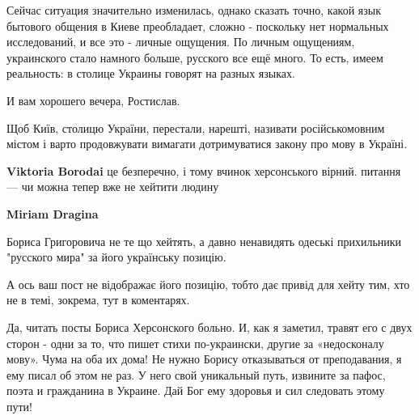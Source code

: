 \begin{itemize}
\begin{itemize}
Сейчас ситуация значительно изменилась, однако сказать точно, какой язык
бытового общения в Киеве преобладает, сложно - поскольку нет нормальных
исследований, и все это - личные ощущения. По личным ощущениям, украинского
стало намного больше, русского все ещё много. То есть, имеем реальность: в
столице Украины говорят на разных языках. 

И вам хорошего вечера, Ростислав.

\end{itemize}

 

Щоб Київ, столицю України, перестали, нарешті, називати російськомовним містом
і варто продовжувати вимагати дотримуватися закону про мову в Україні.

\begin{itemize}
 
\textbf{Viktoria Borodai} це безперечно, і тому вчинок херсонського вірний. питання — чи можна тепер вже не хейтити людину

 
\textbf{Miriam Dragina} 

Бориса Григоровича не те що хейтять, а давно ненавидять одеські прихильники
"русского мира" за його українську позицію.

А ось ваш пост не відображає його позицію, тобто дає привід для хейту тим, хто
не в темі, зокрема, тут в коментарях.
\end{itemize}

 

Да, читать посты Бориса Херсонского больно. И, как я заметил, травят его с двух
сторон - одни за то, что пишет стихи по-украински, другие за «недосконалу
мову». Чума на оба их дома! Не нужно Борису отказываться от преподавания, я ему
писал об этом не раз. У него свой уникальный путь, извините за пафос, поэта и
гражданина в Украине. Дай Бог ему здоровья и сил следовать этому пути!



\end{itemize}
